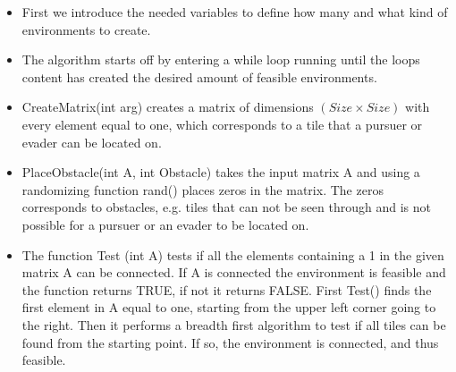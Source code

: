 \begin{itemize}
\item First we introduce the needed variables to define how many and what kind of environments to create. 
\item The algorithm starts off by entering a while loop running until the loops content has created the desired amount of feasible environments. 
\item CreateMatrix(int arg) creates a matrix of dimensions $(Size \times Size)$ with every element equal to one, which corresponds to a tile that a pursuer or evader can be located on.
\item PlaceObstacle(int A, int Obstacle) takes the input matrix A and using a randomizing function rand() places zeros in the matrix. The zeros corresponds to obstacles, e.g. tiles that can not be seen through and is not possible for a pursuer or an evader to be located on.
\item The function Test (int A) tests if all the elements containing a 1 in the given matrix A can be connected. If A is connected the environment is feasible and the function returns TRUE, if not it returns FALSE. First Test() finds the first element in A equal to one, starting from the upper left corner going to the right. Then it performs a breadth first algorithm to test if all tiles can be found from the starting point. If so, the environment is connected, and thus feasible.
\end{itemize}
